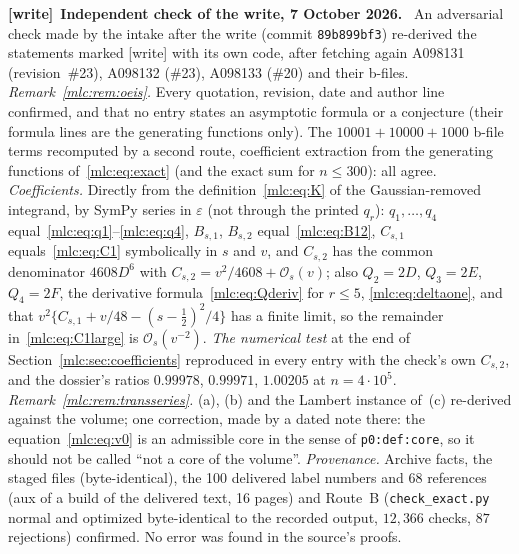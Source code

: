 \documentclass[11pt]{article}
\theoremstyle{remark}\newtheorem{remark}[theorem]{Remark}
\newcommand{\OO}{\mathcal O}
\newcommand{\eps}{\varepsilon}
\newcommand{\file}[1]{\nolinkurl{#1}}
\newenvironment{writenote}[1][]{\par\smallskip\begingroup\small
 \noindent\textbf{[write]}\if\relax\detokenize{#1}\relax\else~\textbf{#1.}\fi\ }%
 {\par\endgroup\smallskip}
\begin{document}
\begin{writenote}[Independent check of the write, 7 October 2026]
An adversarial check made by the intake after the write (commit
\file{89b899bf3}) re-derived the statements marked [write] with its own code,
after fetching again A098131 (revision~\#23), A098132 (\#23), A098133
(\#20) and their b-files. \emph{Remark~\ref{mlc:rem:oeis}.} Every quotation,
revision, date and author line confirmed, and that no entry states an
asymptotic formula or a conjecture (their formula lines are the generating
functions only). The $10001+10000+1000$ b-file terms recomputed by a second
route, coefficient extraction from the generating functions
of~\eqref{mlc:eq:exact} (and the exact sum for $n\le300$): all agree.
\emph{Coefficients.} Directly from the definition~\eqref{mlc:eq:K} of the
Gaussian-removed integrand, by SymPy series in $\eps$ (not through the
printed $q_r$): $q_1,\dots,q_4$ equal~\eqref{mlc:eq:q1}--\eqref{mlc:eq:q4},
$B_{s,1}$, $B_{s,2}$ equal~\eqref{mlc:eq:B12}, $C_{s,1}$
equals~\eqref{mlc:eq:C1} symbolically in $s$ and $v$, and $C_{s,2}$ has the
common denominator $4608D^6$ with $C_{s,2}=v^2/4608+\OO_s(v)$; also
$Q_2=2D$, $Q_3=2E$, $Q_4=2F$, the derivative formula~\eqref{mlc:eq:Qderiv}
for $r\le5$, \eqref{mlc:eq:deltaone}, and that
$v^2\{C_{s,1}+v/48-(s-\tfrac12)^2/4\}$ has a finite limit, so the remainder
in~\eqref{mlc:eq:C1large} is $\OO_s(v^{-2})$. \emph{The numerical test} at the
end of Section~\ref{mlc:sec:coefficients} reproduced in every entry with the
check's own $C_{s,2}$, and the dossier's ratios $0.99978$, $0.99971$, $1.00205$
at $n=4\cdot10^5$. \emph{Remark~\ref{mlc:rem:transseries}.} (a), (b) and the
Lambert instance of~(c) re-derived against the volume; one correction, made
by a dated note there: the equation~\eqref{mlc:eq:v0} is an admissible core in
the sense of \file{p0:def:core}, so it should not be called ``not a core of
the volume''. \emph{Provenance.} Archive facts, the staged files
(byte-identical), the 100 delivered label numbers and 68 references (aux of a
build of the delivered text, 16 pages) and Route~B (\file{check_exact.py}
normal and optimized byte-identical to the recorded output, $12{,}366$ checks,
$87$ rejections) confirmed. No error was found in the source's proofs.
\end{writenote}
\end{document}
